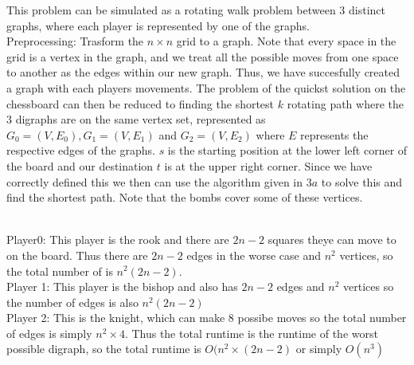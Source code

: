 \documentclass[11pt]{article}
\begin{document}
\begin{enumerate}
\begin{enumerate}
        This problem can be simulated as a rotating walk problem between 3 distinct graphs, where each player is represented by one of the graphs. \\
        Preprocessing: Trasform the $n\times n$ grid to a graph. Note that every space in the grid is a vertex in the graph, and we treat all the possible moves from one space to another as the edges within our new graph. Thus, we have succesfully created a graph with each players movements. The problem of the quickst solution on the chessboard can then be reduced to finding the shortest $k$ rotating path where the 3 digraphs are on the same vertex set, represented as $G_0 = (V, E_0), G_1 = (V, E_1)$ and $ G_2 = (V, E_2)$ where $E$ represents the respective edges of the graphs. $s$ is the starting position at the lower left corner of the board and our destination $t$ is at the upper right corner. Since we have correctly defined this we then can use the algorithm given in $3a$ to solve this and find the shortest path. Note that the bombs cover some of these vertices. 
        
        \\ Player0: This player is the rook and there are $2n-2$ squares theye can move to on the board. Thus there are $2n-2$ edges in the worse case and $n^2$ vertices, so the total number of is $n^2(2n-2)$.
        \\Player 1: This player is the bishop and also has $2n-2$ edges and $n^2$ vertices so the number of edges is also $n^2(2n-2)$\\
        
        Player 2: This is the knight, which can make $8$ possibe moves so the total number of edges is simply $n^2 \times 4$. Thus the total runtime is the runtime of the worst possible digraph, so the total runtime is $O(n^2 \times (2n-2)$ or simply $O(n^3)$
    \end{enumerate}
\end{enumerate}
\end{document}
